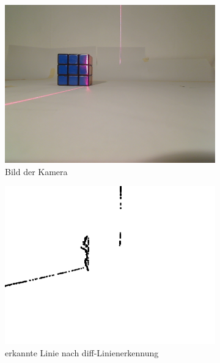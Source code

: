 \documentclass[ngerman,a4paper,parskip=half]{scrartcl}
\begin{document}
\begin{figure}[H]
	\centering
	\begin{subfigure}{0.32\textwidth}
		\includegraphics[width=\textwidth]{includes/blue_dt.png}
		\caption{Bild der Kamera\\}
		\label{fig:blue_dt_cam}
	\end{subfigure}
	\hfill
	\begin{subfigure}{0.32\textwidth}
		\includegraphics[width=\textwidth]{includes/blue_dt_diff.png}
		\caption{erkannte Linie nach diff-Linienerkennung}
		\label{fig:blue_dt_diff}
	\end{subfigure}
	\hfill
	\begin{subfigure}{0.32\textwidth}

\end{subfigure}
\end{figure}
\end{document}
